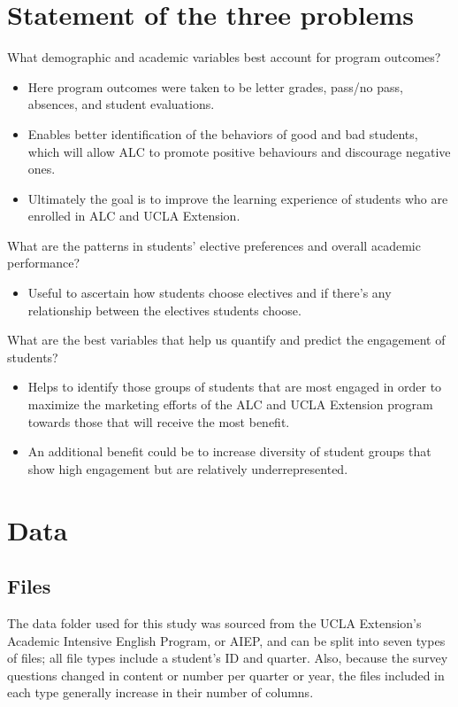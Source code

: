 \documentclass[12pt,letterpaper]{article}
\begin{document}
\section{Statement of the three problems}
What demographic and academic variables best account for program outcomes?
\begin{itemize}
\setlength\itemsep{.1mm}
\item Here program outcomes were taken to be letter grades, pass/no pass, absences, and student evaluations.
\item Enables better identification of the behaviors of good and bad students, which will allow ALC to promote positive behaviours and discourage negative ones. 
\item Ultimately the goal is to improve the learning experience of students who are enrolled in ALC and UCLA Extension. 
\end{itemize}
What are the patterns in students’ elective preferences and overall academic performance?
\begin{itemize}
\setlength\itemsep{.1mm}
\item Useful to ascertain how students choose electives and if there's any relationship between the electives students choose. 
\end{itemize}
What are the best variables that help us quantify and predict the engagement of students?
\begin{itemize}
\setlength\itemsep{.1mm}
\item Helps to identify those groups of students that are most engaged in order to maximize the marketing efforts of the ALC and UCLA Extension program towards those that will receive the most benefit. 
\item An additional benefit could be to increase diversity of student groups that show high engagement but are relatively underrepresented.
\end{itemize}


\section{Data}

\subsection{Files}

The data folder used for this study was sourced from the UCLA Extension’s Academic Intensive English Program, or AIEP, and can be split into seven types of files; all file types include a student’s ID and quarter. Also, because the survey questions changed in content or number per quarter or year, the files included in each type generally increase in their number of columns.
\end{document}
